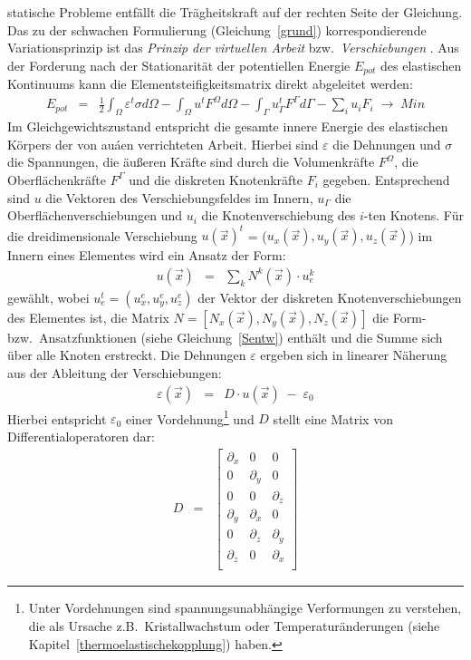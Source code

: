 statische Probleme entfällt die Trägheitskraft auf der rechten Seite der
Gleichung.\\
%
Das zu der schwachen Formulierung (Gleichung~\ref{grund}) korrespondierende
Variationsprinzip ist das {\em Prinzip der virtuellen
Arbeit} bzw.\ {\em Verschiebungen} \cite{Zie84}. Aus der Forderung nach der
Stationarität der potentiellen Energie $E_{pot}$ des elastischen Kontinuums
kann die Elementsteifigkeitsmatrix direkt abgeleitet werden:
\begin{eqnarray}
\label{epot}
 E_{pot} & = & \frac{1}{2} \int_{\Omega} \varepsilon^{t} \sigma d\Omega
           - \int_{\Omega} u^{t} F^{\Omega} d\Omega
           - \int_{\Gamma} u^{t}_{\Gamma} F^{\Gamma} d\Gamma
           - \sum_{i} u_{i} F_{i} \; \rightarrow \; Min
\end{eqnarray}
Im Gleichgewichtszustand entspricht die gesamte innere Energie
des elastischen Körpers der von auáen verrichteten Arbeit.
Hierbei sind $\varepsilon$ die Dehnungen und $\sigma$ die Spannungen,
die äußeren Kräfte sind durch die Volumenkräfte $F^{\Omega}$, die
Oberflächenkräfte $F^{\Gamma}$ und die diskreten Knotenkräfte $F_{i}$
gegeben. Entsprechend sind $u$ die Vektoren des Verschiebungsfeldes im Innern,
$u_{\Gamma}$ die Oberflächenverschiebungen und $u_{i}$ die Knotenverschiebung
des $i$-ten Knotens. Für die dreidimensionale Verschiebung
$u(\vec x)^{t}$ = ($u_x(\vec x), u_y(\vec x), u_z(\vec x)$)
im Innern eines Elementes wird ein Ansatz der Form:
\begin{eqnarray}
\label{uansatz}
 u(\vec x) & = & \sum_{k} N^{k}(\vec x) \cdot u_{e}^{k}
\end{eqnarray}
gewählt, wobei $u_{e}^{t} = (u_x^e, u_y^e, u_z^e)$ der Vektor der diskreten
Knotenverschiebungen des Elementes ist, die Matrix
$N = [N_x(\vec x), N_y(\vec x), N_z(\vec x)]$ die Form- bzw.\
Ansatzfunktionen (siehe Gleichung~\ref{Sentw}) enthält und die Summe sich
über alle Knoten erstreckt.
Die Dehnungen $\varepsilon$ ergeben sich in linearer Näherung aus der
Ableitung der Verschiebungen:
\begin{eqnarray}
\label{elemdehn}
 \varepsilon(\vec x) & = & D \cdot u(\vec x) \; - \; \varepsilon_{0}
\end{eqnarray}
Hierbei entspricht $\varepsilon_{0}$ einer Vordehnung\footnote{Unter
Vordehnungen sind spannungsunabhängige Verformungen zu verstehen, die als
Ursache z.B.\ Kristallwachstum oder Temperaturänderungen (siehe
Kapitel~\ref{thermoelastischekopplung}) haben.} und $D$ stellt eine Matrix
von Differentialoperatoren dar:
\begin{eqnarray}
\label{Doperator}
 D & = &
 \left[
        \begin{array}{lll}
         \partial_{x} & 0            & 0 \\
         0            & \partial_{y} & 0 \\
	 0            & 0            & \partial_{z} \\
	 \partial_{y} & \partial_{x} & 0          \\
	 0            & \partial_{z} & \partial_{y} \\
	 \partial_{z} & 0            & \partial_{x} \\
	\end{array}
 \right]
\end{eqnarray}
